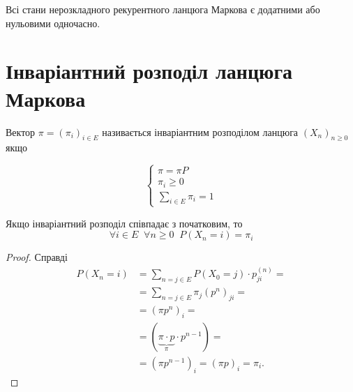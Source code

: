 \begin{corollary}
  Всі стани нерозкладного рекурентного ланцюга Маркова є
  додатними або нульовими одночасно.
\end{corollary}



\section{Інваріантний розподіл ланцюга Маркова}

\begin{definition}
  Вектор $\pi = \left( \pi_i \right) _{i \in E}$ називається інваріантним розподілом
  ланцюга $(X_n)_{n \geq 0}$ якщо

  \[ \begin{cases}
     \pi = \pi P \\
     \pi_i \geq 0 \\
     \sum_{i \in E}^{} \pi_i = 1
  \end{cases} \] 
\end{definition}

\begin{corollary}
  Якщо інваріантний розподіл співпадає з початковим, то 
  \[ \forall i \in E \;\; \forall n \geq 0 \;\; P\left( X_n = i \right) = \pi_i \] 
\end{corollary}

\begin{proof}
  Справді
  \begin{align*}
    P\left( X_n = i \right) &= \sum_{n=j \in E}^{} P\left( X_0 = j \right) \cdot p^{(n)}_{ji} = \\
    &= \sum_{n=j \in E}^{} \pi_j \left( p^{n} \right) _{ji} = \\
    &= \left( \pi p^{n} \right)_i =  \\
    &= \left( \underbrace{\pi\cdot p}_{\pi} \cdot p^{n-1} \right) = \\
    &= \left( \pi p^{n-1} \right)_i = \left( \pi p \right) _i = \pi_i
  .\end{align*}
\end{proof}


